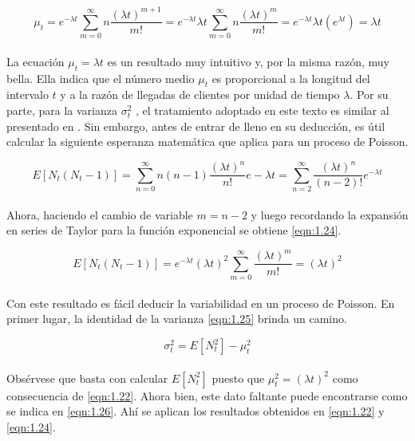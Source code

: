 \begin{equation}
    \mu_{t}= e^{-\lambda t}\sum_{m=0}^{\infty}n\frac{\left ( \lambda t \right )^{m+1}}{m!}=e^{-\lambda t} \lambda t \sum_{m=0}^{\infty}n\frac{\left ( \lambda t \right )^{m}}{m!}=e^{-\lambda t}\lambda t\left ( e^{\lambda t} \right )=\lambda t
    \label{eqn:1.22}
\end{equation}
\\
La ecuación $ \mu_{t}=\lambda t $ es un resultado muy intuitivo y, por la misma razón, muy bella. Ella indica que el número medio $ \mu _{t} $ es proporcional a la longitud del intervalo $ t $ y a la razón de llegadas de clientes por unidad de tiempo $ \lambda $. Por su parte, para la varianza $\sigma _{t}^{2}$ , el tratamiento adoptado en este texto es similar al presentado en \cite{kleinrock1975}. Sin embargo, antes de entrar de lleno en su deducción, es útil calcular la siguiente esperanza matemática que aplica para un proceso de Poisson. 

\begin{equation}
    E\left [ N_{t}\left ( N_{t}-1 \right ) \right ]=\sum_{n=0}^{\infty}n\left ( n-1 \right )\frac{\left ( \lambda t \right )^{n}}{n!}e-\lambda t = \sum_{n=2}^{\infty}\frac{\left ( \lambda t \right )^{n}}{\left ( n-2 \right )!}e^{- \lambda t}
    \label{eqn:1.23}
\end{equation}
\\
Ahora, haciendo el cambio de variable $ m=n-2 $ y luego recordando la expansión en series de Taylor para la función exponencial se obtiene \ref{eqn:1.24}.

\begin{equation}
    E\left [ N_{t}\left ( N_{t}-1 \right ) \right ]=e^{- \lambda t}\left ( \lambda t \right )^{2} \sum_{m=0}^{\infty}\frac{\left ( \lambda t \right )^{m}}{m!}=\left ( \lambda t \right )^{2}
    \label{eqn:1.24}
\end{equation}
\\
Con este resultado es fácil deducir la variabilidad en un proceso de Poisson. En primer lugar, la identidad de la varianza \ref{eqn:1.25} brinda un camino.

\begin{equation}
    \sigma _{t}^{2}=E\left [ N_{t}^{2} \right ]-\mu _{t}^{2}
    \label{eqn:1.25}
\end{equation}
\\
Obsérvese que basta con calcular $ E\left [ N_{t}^{2} \right ] $ puesto que $ \mu _{t}^{2}=\left ( \lambda t \right )^{2}  $ como consecuencia de \ref{eqn:1.22}.
Ahora bien, este dato faltante puede encontrarse como se indica en \ref{eqn:1.26}. Ahí se aplican los resultados obtenidos en \ref{eqn:1.22} y \ref{eqn:1.24}.

